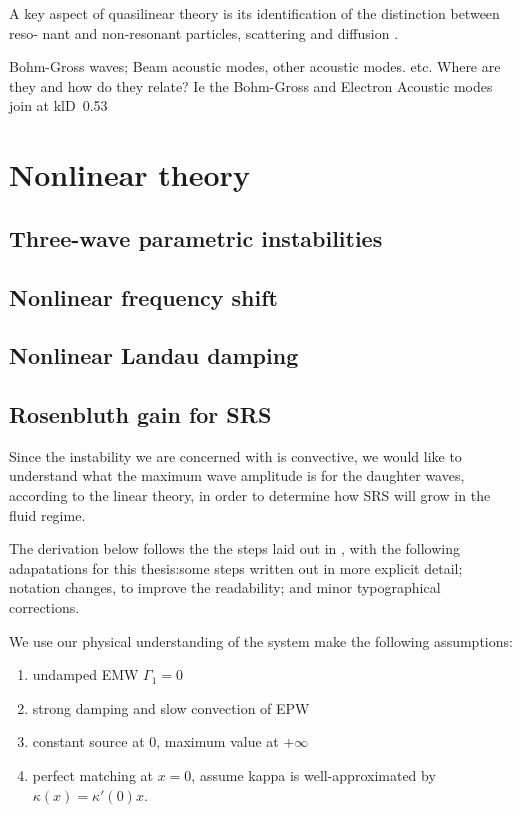 A key aspect of quasilinear theory is its identification of the distinction between reso-
nant and non-resonant particles, scattering and diffusion \citep{Sagdeev2018}.

Bohm-Gross waves; Beam acoustic modes, other acoustic modes.
etc. Where are they and how do they relate? Ie the Bohm-Gross and Electron
Acoustic modes join at klD~0.53

\section{Nonlinear theory}
\subsection{Three-wave parametric instabilities}
\subsection{Nonlinear frequency shift}
\subsection{Nonlinear Landau damping}

\subsection{Rosenbluth gain for SRS}

Since the instability we are concerned with is convective, we would like to understand what the maximum wave amplitude is for the daughter waves, according to the linear theory, in order to determine how SRS will grow in the fluid regime.

The derivation below follows the the steps laid out in \citet{Nishikawa1976}, with the following adapatations for this thesis:some steps written out in more explicit detail; notation changes, to improve the readability; and minor typographical corrections. 

We use our physical understanding of the system make the following assumptions:
\begin{enumerate}
	\item undamped EMW $\Gamma_1 = 0$
	\item strong damping and slow convection of EPW
	\item constant source at 0, maximum value at $+\infty$
	\item perfect matching at $x=0$, assume kappa is well-approximated by 
	$\kappa(x) = \kappa'(0)x$.
\end{enumerate}

